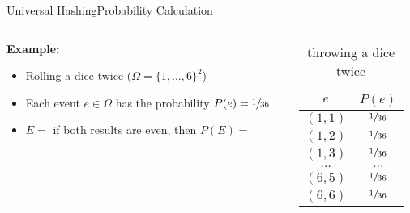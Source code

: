 \begin{frame}{Universal Hashing}{Probability Calculation}
  \begin{columns}
    \begin{column}{0.65\linewidth}
      \textbf{Example:}
      \begin{itemize}
        \item<2->
          Rolling a dice twice ({\color{MainA}$\Omega = \{1,\dots,6\}^2$})
        \item<3->
          Each event {\color{MainA}$e \in \Omega$} has the probability
          {\color{MainA}$P(e) = \sfrac{1}{36}$}
        \item<4->
          {\color{MainA}$E =$} if both results are even,
          then {\color{MainA}$P(E)=$}
      \end{itemize}
    \end{column}
    \begin{column}{0.35\linewidth}
      \begin{table}[!h]
        \caption{throwing a dice twice}
        \label{tab:probabilities_rolling_dice_twice}
        \begin{tabularx}{0.8\linewidth}{c|c}
          {\color{MainA}$e$} & {\color{MainA} $P(e)$}\\
          \midrule
          $(1, 1)$ & $\sfrac{1}{36}$\\
          $(1, 2)$ & $\sfrac{1}{36}$\\
          $(1, 3)$ & $\sfrac{1}{36}$\\
          $\dots$ & $\dots$\\
          $(6, 5)$ & $\sfrac{1}{36}$\\
          $(6, 6)$ & $\sfrac{1}{36}$\\
        \end{tabularx}
      \end{table}
    \end{column}
  \end{columns}
\end{frame}


